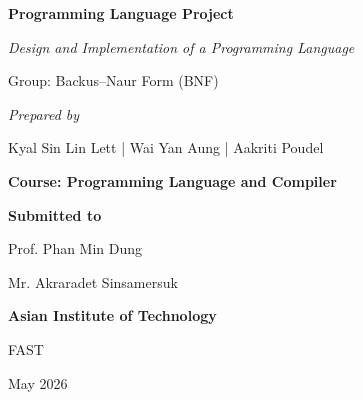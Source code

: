 \documentclass[12pt,a4paper]{article}
\begin{document}
\begin{titlepage}
    \centering
    \vspace*{1.0cm}

    {\Huge\bfseries\color{darkblue}
    Programming Language Project\par}

    \vspace{0.5cm}

    {\Large\itshape\color{softgray}
    Design and Implementation of a Programming Language\par}

    \vspace{1.3cm}

    \vspace{0.3cm}

    {\large\color{softgray}
    Group:  Backus--Naur Form (BNF)\par}

    \vspace{2.0cm}

    {\Large\itshape\color{darkblue} Prepared by\par}

    \vspace{0.8cm}

    {\Large\color{darkblue}
    Kyal Sin Lin Lett \quad | \quad
    Wai Yan Aung \quad | \quad
    Aakriti Poudel\par}

    \vspace{1.8cm}

    {\Large\bfseries\color{darkblue}
    Course: Programming Language and Compiler\par}

    \vspace{1.6cm}

    {\Large\bfseries\color{darkblue}
    Submitted to\par}

    \vspace{0.3cm}

    {\Large\color{darkblue}
    Prof. Phan Min Dung\par}

    {\Large\color{darkblue}
    Mr. Akraradet Sinsamersuk\par}

    \vfill

    {\Large\bfseries\color{darkblue}
    Asian Institute of Technology\par}

    \vspace{0.2cm}

    {\Large\color{darkblue}
    FAST\par}

    \vspace{0.8cm}

    {\Large\color{softgray}
    May 2026\par}

\end{titlepage}
\end{document}
